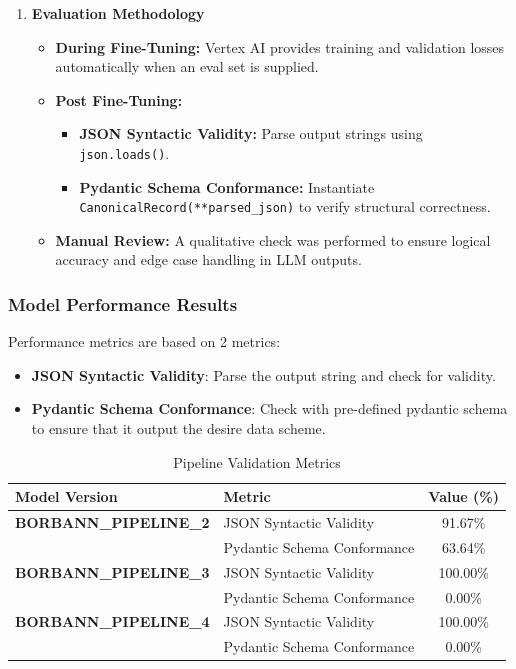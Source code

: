 \begin{enumerate}
    \item \textbf{Evaluation Methodology}

    \begin{itemize}
        \item \textbf{During Fine-Tuning:} Vertex AI provides training and validation losses automatically when an eval set is supplied.
        \item \textbf{Post Fine-Tuning:}
            \begin{itemize}
                \item \textbf{JSON Syntactic Validity:} Parse output strings using \texttt{json.loads()}.
                \item \textbf{Pydantic Schema Conformance:} Instantiate \texttt{CanonicalRecord(**parsed\_json)} to verify structural correctness.
            \end{itemize}
        \item \textbf{Manual Review:} A qualitative check was performed to ensure logical accuracy and edge case handling in LLM outputs.
    \end{itemize}
\end{enumerate}


\subsubsection{Model Performance Results}
Performance metrics are based on 2 metrics:
        \begin{itemize}
            \item \textbf{JSON Syntactic Validity}: Parse the output string and check for validity.
            \item \textbf{Pydantic Schema Conformance}: Check with pre-defined pydantic schema to ensure that it output the desire data scheme.
        \end{itemize}

\begin{table}[htbp]
    \centering
    \caption{Pipeline Validation Metrics}
    \label{tab:pipeline_validation_metrics}
    \begin{tabular}{llc}
        \toprule
        \textbf{Model Version} & \textbf{Metric} & \textbf{Value (\%)} \\
        \midrule
        \textbf{BORBANN\_PIPELINE\_2} 
            & JSON Syntactic Validity & 91.67\% \\
            & Pydantic Schema Conformance & 63.64\% \\
        \midrule
        \textbf{BORBANN\_PIPELINE\_3} 
            & JSON Syntactic Validity & 100.00\% \\
            & Pydantic Schema Conformance & 0.00\% \\
        \midrule
        \textbf{BORBANN\_PIPELINE\_4} 
            & JSON Syntactic Validity & 100.00\% \\
            & Pydantic Schema Conformance & 0.00\% \\
        \bottomrule
    \end{tabular}
\end{table}


